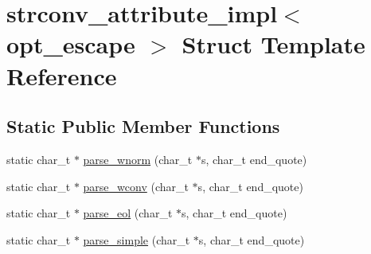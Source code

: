 \hypertarget{structstrconv__attribute__impl}{\section{strconv\-\_\-attribute\-\_\-impl$<$ opt\-\_\-escape $>$ Struct Template Reference}
\label{structstrconv__attribute__impl}
}
\subsection*{Static Public Member Functions}
\begin{DoxyCompactItemize}
\item 
static char\-\_\-t $\ast$ \hyperlink{structstrconv__attribute__impl_a9b7f8b1e860c5d022dbd29f9a89e9e27}{parse\-\_\-wnorm} (char\-\_\-t $\ast$s, char\-\_\-t end\-\_\-quote)
\item 
static char\-\_\-t $\ast$ \hyperlink{structstrconv__attribute__impl_a2d39998b79896af7c53c5f3dc22a526b}{parse\-\_\-wconv} (char\-\_\-t $\ast$s, char\-\_\-t end\-\_\-quote)
\item 
static char\-\_\-t $\ast$ \hyperlink{structstrconv__attribute__impl_a0f57ee9d69b9d626765f4a9c8af6df2e}{parse\-\_\-eol} (char\-\_\-t $\ast$s, char\-\_\-t end\-\_\-quote)
\item 
static char\-\_\-t $\ast$ \hyperlink{structstrconv__attribute__impl_a8358dc980178e55c8669b9dcd04872d7}{parse\-\_\-simple} (char\-\_\-t $\ast$s, char\-\_\-t end\-\_\-quote)
\end{DoxyCompactItemize}


